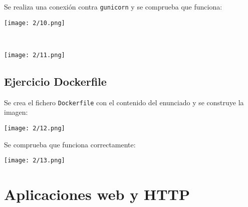 Se realiza una conexión contra \Verb#gunicorn# y se comprueba que funciona: \\
\begin{minipage}{\linewidth}
	\centering
	\texttt{[image: 2/10.png]}
	\label{fig:2/10}
\end{minipage}
\\
\begin{minipage}{\linewidth}
	\centering
	\texttt{[image: 2/11.png]}
	\label{fig:2/11}
\end{minipage}

\subsection{Ejercicio Dockerfile}
Se crea el fichero \Verb#Dockerfile# con el contenido del enunciado y se construye la
imagen: \\
\begin{minipage}{\linewidth}
	\centering
	\texttt{[image: 2/12.png]}
	\label{fig:2/12}
\end{minipage}

Se comprueba que funciona correctamente: \\
\begin{minipage}{\linewidth}
	\centering
	\texttt{[image: 2/13.png]}
	\label{fig:2/13}
\end{minipage}

\section{Aplicaciones web y HTTP}\label{sec:2/2}
